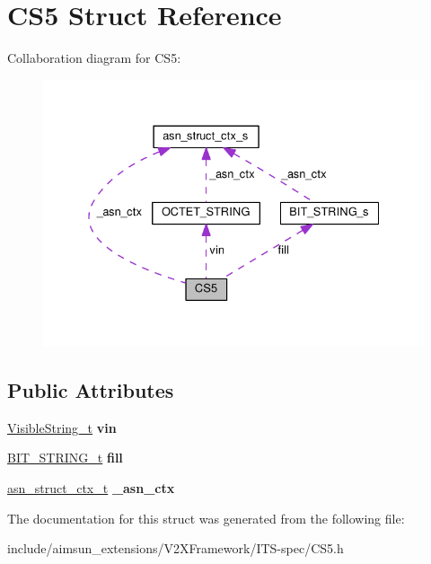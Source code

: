 \hypertarget{structCS5}{}\section{C\+S5 Struct Reference}
\label{structCS5}


Collaboration diagram for C\+S5\+:\nopagebreak
\begin{figure}[H]
\begin{center}
\leavevmode
\includegraphics[width=334pt]{structCS5__coll__graph}
\end{center}
\end{figure}
\subsection*{Public Attributes}
\begin{DoxyCompactItemize}
\item 
\hyperlink{structOCTET__STRING}{Visible\+String\+\_\+t} {\bfseries vin}\hypertarget{structCS5_a2754f094b3be072340386e12dbd5ad71}{}\label{structCS5_a2754f094b3be072340386e12dbd5ad71}

\item 
\hyperlink{structBIT__STRING__s}{B\+I\+T\+\_\+\+S\+T\+R\+I\+N\+G\+\_\+t} {\bfseries fill}\hypertarget{structCS5_ab6444c19b458277c296e216ffbad65ca}{}\label{structCS5_ab6444c19b458277c296e216ffbad65ca}

\item 
\hyperlink{structasn__struct__ctx__s}{asn\+\_\+struct\+\_\+ctx\+\_\+t} {\bfseries \+\_\+asn\+\_\+ctx}\hypertarget{structCS5_a21e9400c3f19a85eb8882eda1481b897}{}\label{structCS5_a21e9400c3f19a85eb8882eda1481b897}

\end{DoxyCompactItemize}


The documentation for this struct was generated from the following file\+:\begin{DoxyCompactItemize}
\item 
include/aimsun\+\_\+extensions/\+V2\+X\+Framework/\+I\+T\+S-\/spec/C\+S5.\+h\end{DoxyCompactItemize}
